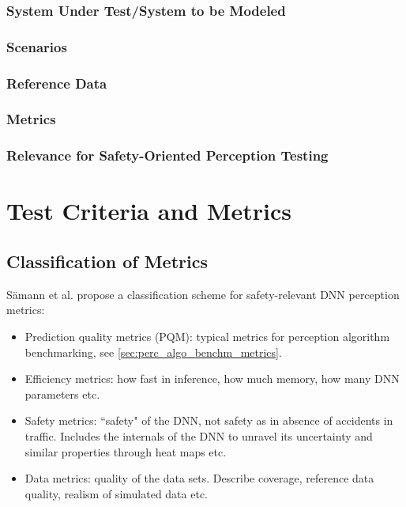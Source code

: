 \documentclass[conference]{IEEEtran}
\newcommand{\new}[1]{{\color{my-red}#1}}
\begin{document}
\subsubsection{System Under Test/System to be Modeled}
\subsubsection{Scenarios}


\subsubsection{Reference Data}
\subsubsection{Metrics}

\subsubsection{Relevance for Safety-Oriented Perception Testing}


%
%




\section{Test Criteria and Metrics}
\label{sec:axis_criteria_metrics}

\subsection{\new{Classification of Metrics}}
Sämann et al. \cite{Saemann2020strategy} propose a classification scheme for safety-relevant DNN perception metrics: 
\begin{itemize}
\item Prediction quality metrics (PQM): typical metrics for perception algorithm benchmarking, see \ref{sec:perc_algo_benchm_metrics}.
\item Efficiency metrics: how fast in inference, how much memory, how many DNN parameters etc.
\item Safety metrics: ``safety" of the DNN, not safety as in absence of accidents in traffic. Includes the internals of the DNN to unravel its uncertainty and similar properties through heat maps etc.
\item Data metrics: quality of the data sets. Describe coverage, reference data quality, realism of simulated data etc. 
\end{itemize}
\end{document}
